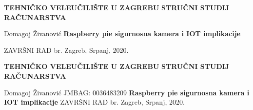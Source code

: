 \documentclass[12pt,a4paper]{article}
\date{}
\newcommand{\collegeName}{TEHNIČKO VELEUČILIŠTE U ZAGREBU}
\newcommand{\smjer}{STRUČNI STUDIJ RAČUNARSTVA}
\newcommand{\radTittle}{Raspberry pie sigurnosna kamera i IOT implikacije}
\newcommand{\radNumber}{}
\begin{document}
\begin{center} \obeylines
  {\large \textbf{\collegeName}}
  {\normalsize \textbf{\smjer}}
\end{center}
\begin{center} \obeylines
  \vspace{\fill}
    Domagoj Živanović 
    {\Large \textbf{\radTittle}}
    \item ZAVRŠNI RAD br. \radNumber
  \vspace*{\fill}
  Zagreb, Srpanj, 2020.
\end{center}

\thispagestyle{empty}

\clearpage

\begin{center} \obeylines
  {\large \textbf{\collegeName}}
  {\normalsize \textbf{\smjer}}
\end{center}
\begin{center} \obeylines
  \vspace{\fill}
      Domagoj Živanović
      JMBAG: 0036483209
    {\Large \textbf{\radTittle}}
    ZAVRŠNI RAD br. \radNumber
  \vspace*{\fill}
  Zagreb, Srpanj, 2020.
\end{center}

\thispagestyle{empty}

\clearpage


\tableofcontents
\clearpage
\listoftables
\listoffigures







\end{document}
